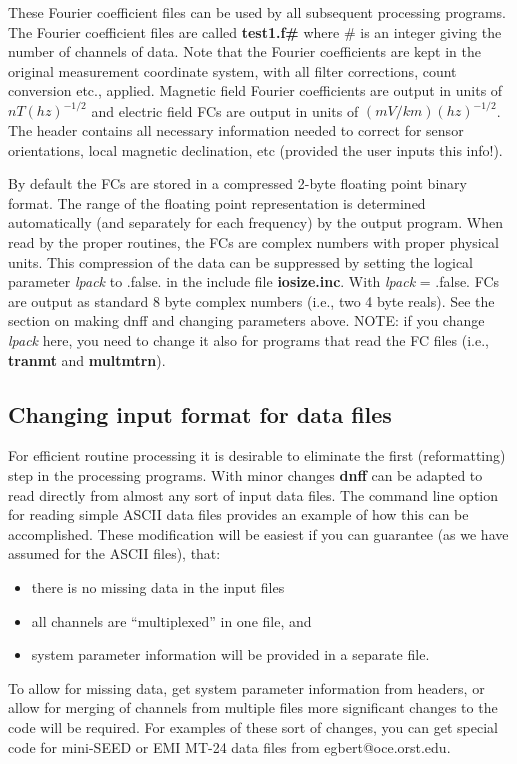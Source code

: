 These Fourier coefficient files can be used by all
subsequent processing programs.
The Fourier coefficient files are called {\bf test1.f\#}
where \# is an integer giving the number of channels of data.
Note that the Fourier coefficients are kept in the original
measurement coordinate system, with all filter corrections,
count conversion etc., applied.
Magnetic field Fourier coefficients are
output in units of $nT (hz)^{-1/2}$ and electric field FCs
are output in units of $(mV/km)(hz)^{-1/2}$.
The header contains all necessary information needed to correct for
sensor orientations, local magnetic declination, etc
(provided the user inputs this info!).

By default the FCs are stored
in a compressed 2-byte floating point binary format.
The range of the floating point representation
is determined automatically (and separately for
each frequency) by the output program.
When read by the proper routines, the FCs are
complex numbers with proper physical units.
This compression of the data
can be suppressed by setting the logical parameter {\it lpack}
to .false. in the include file {\bf iosize.inc}.
With {\it lpack} = .false. FCs are output as 
standard 8 byte complex numbers (i.e., two 4 byte reals). 
See the section on making dnff and changing parameters above.
NOTE: if you change {\it lpack} here, you need to change it
also for programs that read the FC files (i.e., {\bf tranmt}
and {\bf multmtrn}).

\subsection{Changing input format for data files}

For efficient routine processing it is desirable to eliminate the first 
(reformatting) step in the processing programs.
With minor changes {\bf dnff} can be adapted to read directly
from almost any sort of input data files.
The command line option for reading simple ASCII data files
provides an example of how this can be accomplished.
These modification will
be easiest if you can guarantee
(as we have assumed for the ASCII files), that:
\begin{itemize}
\item
there is no missing data in the input files
\item
all channels are ``multiplexed'' in one file, and
\item
system parameter information will be provided in a separate file.
\end{itemize}
To allow for missing data, get system parameter information from
headers, or allow for merging of channels from multiple files
more significant changes to the code will be required.
For examples of these sort of changes, you can get special code
for mini-SEED or EMI MT-24 data files from egbert@oce.orst.edu. 

